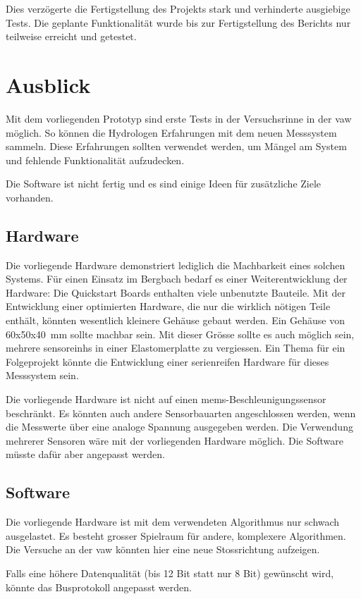Dies verzögerte die Fertigstellung des Projekts stark und verhinderte ausgiebige Tests. Die geplante Funktionalität wurde bis zur Fertigstellung des Berichts nur teilweise erreicht und getestet.

\section{Ausblick}
Mit dem vorliegenden Prototyp sind erste Tests in der Versuchsrinne in der \gls{vaw} möglich. So können die Hydrologen Erfahrungen mit dem neuen Messsystem sammeln. Diese Erfahrungen sollten verwendet werden, um Mängel am System und fehlende Funktionalität aufzudecken. 

Die Software ist nicht fertig und es sind einige Ideen für zusätzliche Ziele vorhanden.

\subsection{Hardware}
Die vorliegende Hardware demonstriert lediglich die Machbarkeit eines solchen Systems. Für einen Einsatz im Bergbach bedarf es einer Weiterentwicklung der Hardware: Die Quickstart Boards enthalten viele unbenutzte Bauteile. Mit der Entwicklung einer optimierten Hardware, die nur die wirklich nötigen Teile enthält, könnten wesentlich kleinere Gehäuse gebaut werden. Ein Gehäuse von 60x50x40~mm sollte machbar sein. Mit dieser Grösse sollte es auch möglich sein, mehrere \glspl{sensoreinh} in einer Elastomerplatte zu vergiessen. Ein Thema für ein Folgeprojekt könnte die Entwicklung einer serienreifen Hardware für dieses Messsystem sein.

Die vorliegende Hardware ist nicht auf einen \gls{mems}-Beschleunigungssensor beschränkt. Es könnten auch andere Sensorbauarten angeschlossen werden, wenn die Messwerte über eine analoge Spannung ausgegeben werden. Die Verwendung mehrerer Sensoren wäre mit der vorliegenden Hardware möglich. Die Software müsste dafür aber angepasst werden.

\subsection{Software}
Die vorliegende Hardware ist mit dem verwendeten Algorithmus nur schwach ausgelastet. Es besteht grosser Spielraum für andere, komplexere Algorithmen. Die Versuche an der \gls{vaw} könnten hier eine neue Stossrichtung aufzeigen.

Falls eine höhere Datenqualität (bis 12 Bit statt nur 8 Bit) gewünscht wird, könnte das Busprotokoll angepasst werden.

